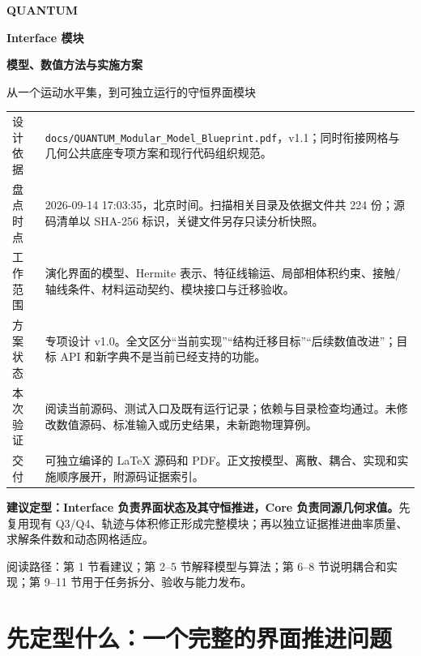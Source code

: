 \documentclass[UTF8,a4paper,11pt,fontset=fandol]{ctexart}
\newcommand{\code}[1]{\nolinkurl{#1}}
\newcommand{\decision}[1]{\par\medskip\noindent\colorbox{pale}{\parbox{\dimexpr\linewidth-2\fboxsep}{\strut #1\strut}}\par\medskip}
\begin{document}
\hypersetup{pageanchor=false}
\begin{titlepage}
\vspace*{12mm}
{\Large\bfseries\color{accent}QUANTUM\par}
\vspace{8mm}
{\Huge\bfseries\color{ink}Interface 模块\par}
\vspace{5mm}
{\LARGE\bfseries 模型、数值方法与实施方案\par}
\vspace{8mm}
{\large 从一个运动水平集，到可独立运行的守恒界面模块\par}
\vspace{12mm}
\noindent\begin{tabularx}{\textwidth}{@{}P{.20\textwidth}X@{}}
\toprule
设计依据 & \code{docs/QUANTUM_Modular_Model_Blueprint.pdf}，v1.1；同时衔接网格与几何公共底座专项方案和现行代码组织规范。\\
盘点时点 & 2026-09-14 17:03:35，北京时间。扫描相关目录及依据文件共 224 份；源码清单以 SHA-256 标识，关键文件另存只读分析快照。\\
工作范围 & 演化界面的模型、Hermite 表示、特征线输运、局部相体积约束、接触/轴线条件、材料运动契约、模块接口与迁移验收。\\
方案状态 & 专项设计 v1.0。全文区分“当前实现”“结构迁移目标”“后续数值改进”；目标 API 和新字典不是当前已经支持的功能。\\
本次验证 & 阅读当前源码、测试入口及既有运行记录；依赖与目录检查均通过。未修改数值源码、标准输入或历史结果，未新跑物理算例。\\
交付 & 可独立编译的 LaTeX 源码和 PDF。正文按模型、离散、耦合、实现和实施顺序展开，附源码证据索引。\\
\bottomrule
\end{tabularx}
\vspace{9mm}
\decision{\textbf{建议定型：Interface 负责界面状态及其守恒推进，Core 负责同源几何求值。}先复用现有 Q3/Q4、轨迹与体积修正形成完整模块；再以独立证据推进曲率质量、求解条件数和动态网格适应。}
\vfill
{\small\color{muted}阅读路径：第 1 节看建议；第 2--5 节解释模型与算法；第 6--8 节说明耦合和实现；第 9--11 节用于任务拆分、验收与能力发布。}
\end{titlepage}
\hypersetup{pageanchor=true}
{\small\setlength{\parskip}{0pt}\tableofcontents}
\clearpage

\section{先定型什么：一个完整的界面推进问题}
\end{document}
